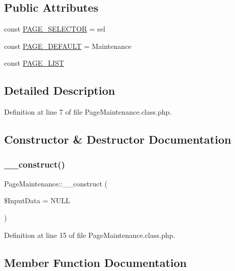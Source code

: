 \subsection*{Public Attributes}
\begin{DoxyCompactItemize}
\item 
const \hyperlink{class_page_maintenance_ae9d97a84bfec9996f5964b231ba5807f}{P\+A\+G\+E\+\_\+\+S\+E\+L\+E\+C\+T\+OR} = \textquotesingle{}sel\textquotesingle{}
\item 
const \hyperlink{class_page_maintenance_a476248e2c6d7e684b296d513030e1899}{P\+A\+G\+E\+\_\+\+D\+E\+F\+A\+U\+LT} = \textquotesingle{}Maintenance\textquotesingle{}
\item 
const \hyperlink{class_page_maintenance_ad6903242a92c1315d94dfc3c0a8413aa}{P\+A\+G\+E\+\_\+\+L\+I\+ST}
\end{DoxyCompactItemize}


\subsection{Detailed Description}


Definition at line 7 of file Page\+Maintenance.\+class.\+php.



\subsection{Constructor \& Destructor Documentation}
\mbox{\label{class_page_maintenance_a2a5e95018231b6fafd22b03678eaad4f}} 
\subsubsection{\texorpdfstring{\+\_\+\+\_\+construct()}{\_\_construct()}}
{\footnotesize\ttfamily Page\+Maintenance\+::\+\_\+\+\_\+construct (\begin{DoxyParamCaption}\item[{}]{\$\+Input\+Data = {\ttfamily NULL} }\end{DoxyParamCaption})}



Definition at line 15 of file Page\+Maintenance.\+class.\+php.



\subsection{Member Function Documentation}
\mbox{\label{class_page_maintenance_aa48915beae65efb4ea5ab03d3c7c618c}} 
